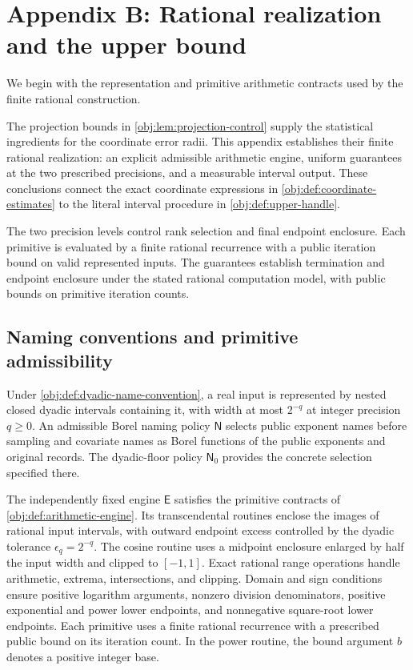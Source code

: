 \section{Appendix B: Rational realization and the upper bound}
\label{sec:rational-realization}

We begin with the representation and primitive arithmetic contracts used by the finite rational construction.

The projection bounds in \cref{obj:lem:projection-control} supply the statistical ingredients for the coordinate error radii. This appendix establishes their finite rational realization: an explicit admissible arithmetic engine, uniform guarantees at the two prescribed precisions, and a measurable interval output. These conclusions connect the exact coordinate expressions in \cref{obj:def:coordinate-estimates} to the literal interval procedure in \cref{obj:def:upper-handle}.

The two precision levels control rank selection and final endpoint enclosure. Each primitive is evaluated by a finite rational recurrence with a public iteration bound on valid represented inputs. The guarantees establish termination and endpoint enclosure under the stated rational computation model, with public bounds on primitive iteration counts.

\subsection{Naming conventions and primitive admissibility}

Under \cref{obj:def:dyadic-name-convention}, a real input is represented by nested closed dyadic intervals containing it, with width at most \(2^{-q}\) at integer precision \(q\ge0\). An admissible Borel naming policy \(\mathsf N\) selects public exponent names before sampling and covariate names as Borel functions of the public exponents and original records. The dyadic-floor policy \(\mathsf N_0\) provides the concrete selection specified there.

The independently fixed engine \(\mathsf E\) satisfies the primitive contracts of \cref{obj:def:arithmetic-engine}. Its transcendental routines enclose the images of rational input intervals, with outward endpoint excess controlled by the dyadic tolerance \(\epsilon_q=2^{-q}\). The cosine routine uses a midpoint enclosure enlarged by half the input width and clipped to \([-1,1]\). Exact rational range operations handle arithmetic, extrema, intersections, and clipping. Domain and sign conditions ensure positive logarithm arguments, nonzero division denominators, positive exponential and power lower endpoints, and nonnegative square-root lower endpoints. Each primitive uses a finite rational recurrence with a prescribed public bound on its iteration count. In the power routine, the bound argument \(b\) denotes a positive integer base.

